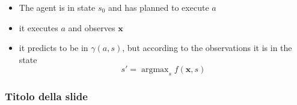 \documentclass{beamer}
\DeclareMathOperator*{\argmax}{argmax}
\def\bx{\pmb{x}}
\begin{document}
\begin{frame}
  \begin{itemize}
  \item The agent is in state $s_0$ and has planned to execute $a$
  \item it executes $a$ and observes $\bx$
  \item it predicts to be in $\gamma(a,s)$, but according to the
    observations it is in the state
    $$
    s'=\argmax_sf(\bx,s)
    $$
  \end{itemize}
\end{frame}
\begin{frame}
  \frametitle{Titolo della slide}
\end{frame}
\end{document}

